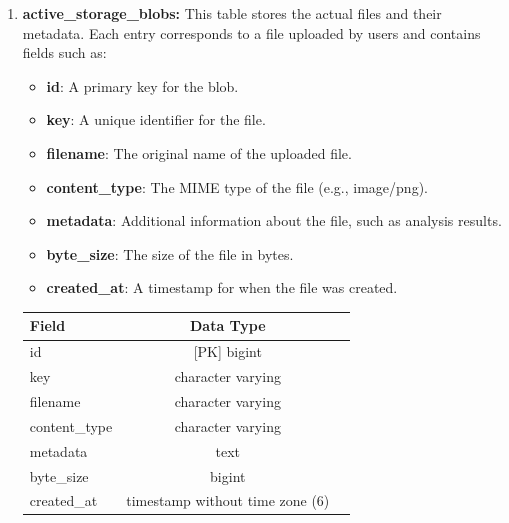 \begin{enumerate}
\begin{enumerate}
            \item \textbf{active\_storage\_blobs:} This table stores the actual files and their metadata. Each entry corresponds to a file uploaded by users and contains fields such as:
            \begin{itemize}
                \item \textbf{id}: A primary key for the blob.
                \item \textbf{key}: A unique identifier for the file.
                \item \textbf{filename}: The original name of the uploaded file.
                \item \textbf{content\_type}: The MIME type of the file (e.g., image/png).
                \item \textbf{metadata}: Additional information about the file, such as analysis results.
                \item \textbf{byte\_size}: The size of the file in bytes.
                \item \textbf{created\_at}: A timestamp for when the file was created.
            \end{itemize}

            \bigskip
            \begin{table}[h!]
            \centering
            \begin{tabular}{lcc}
                \hline
                \textbf{Field}               & \textbf{Data Type}                 \\ \hline
                id                           & [PK] bigint                        \\ 
                key                          & character varying                  \\ 
                filename                     & character varying                  \\ 
                content\_type                & character varying                  \\ 
                metadata                     & text                               \\ 
                byte\_size                   & bigint                             \\ 
                created\_at                 & timestamp without time zone (6)    \\ \hline
            \end{tabular}
            

\end{table}
\end{enumerate}
\end{enumerate}
